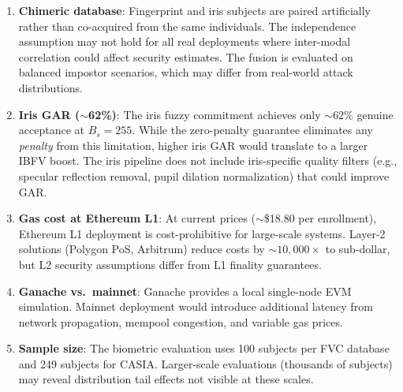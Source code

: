 \begin{enumerate}
  \item \textbf{Chimeric database}: Fingerprint and iris subjects are paired
  artificially rather than co-acquired from the same individuals. The independence
  assumption may not hold for all real deployments where inter-modal correlation
  could affect security estimates. The fusion is evaluated on balanced impostor
  scenarios, which may differ from real-world attack distributions.

  \item \textbf{Iris GAR ($\sim$62\%)}: The iris fuzzy commitment achieves only
  $\sim$62\% genuine acceptance at $B_s = 255$. While the zero-penalty guarantee
  eliminates any \emph{penalty} from this limitation, higher iris GAR would
  translate to a larger IBFV boost. The iris pipeline does not include
  iris-specific quality filters (e.g., specular reflection removal, pupil dilation
  normalization) that could improve GAR.

  \item \textbf{Gas cost at Ethereum L1}: At current prices ($\sim$\$18.80 per
  enrollment), Ethereum L1 deployment is cost-prohibitive for large-scale systems.
  Layer-2 solutions (Polygon PoS, Arbitrum) reduce costs by $\sim 10{,}000\times$
  to sub-dollar, but L2 security assumptions differ from L1 finality guarantees.

  \item \textbf{Ganache vs.\ mainnet}: Ganache provides a local single-node
  EVM simulation. Mainnet deployment would introduce additional latency from
  network propagation, mempool congestion, and variable gas prices.

  \item \textbf{Sample size}: The biometric evaluation uses 100 subjects per
  FVC database and 249 subjects for CASIA. Larger-scale evaluations (thousands
  of subjects) may reveal distribution tail effects not visible at these scales.
\end{enumerate}



